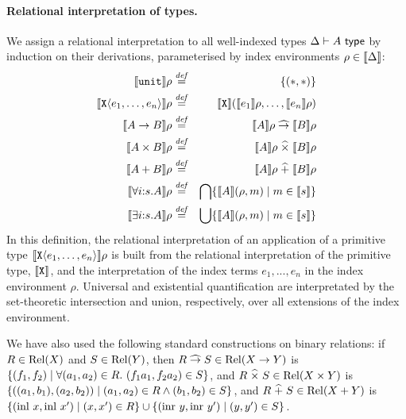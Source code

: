\paragraph{Relational interpretation of types.}
We assign a relational interpretation to all well-indexed types $\Delta
\vdash A \textup{\textsf{ type}}$ by induction on their derivations, parameterised by
index environments 
$\rho \in \llbracket \Delta \rrbracket$:
\begin{eqnarray*}
  \llbracket \texttt{unit} \rrbracket \rho & \stackrel{\mathit{def}}= & \{(*,*)\} \\
  \llbracket \textup{\texttt{X}}\langle e_1,\ldots,e_n \rangle \rrbracket\rho & \stackrel{\mathit{def}}= & 
  \llbracket \textup{\texttt{X}} \rrbracket (\llbracket e_1 \rrbracket\rho, \ldots,
  \llbracket e_n \rrbracket\rho)\\
  \llbracket A \to B \rrbracket \rho & \stackrel{\mathit{def}}= & \llbracket A \rrbracket\rho \mathrel{\widehat\to} \llbracket B \rrbracket \rho \\
  \llbracket A \times B \rrbracket\rho & \stackrel{\mathit{def}}= & \llbracket A \rrbracket \rho \mathrel{\widehat\times} \llbracket B \rrbracket \rho \\
  \llbracket A + B \rrbracket \rho & \stackrel{\mathit{def}}= & \llbracket A \rrbracket \rho \mathrel{\widehat+} \llbracket B \rrbracket \rho \\
  \llbracket \forall i\mathord:s.A \rrbracket \rho & \stackrel{\mathit{def}}= & 
  \bigcap\{ \llbracket A \rrbracket {(\rho,m)} \mathrel| m \in \llbracket s \rrbracket \} \\
  \llbracket \exists i\mathord:s.A \rrbracket \rho & \stackrel{\mathit{def}}= & 
  \bigcup\{ \llbracket A \rrbracket {(\rho,m)} \mathrel| m \in \llbracket s \rrbracket \}
\end{eqnarray*}
In this definition, the relational interpretation of an application of
a primitive type $\llbracket \textup{\texttt{X}}\langle e_1,\ldots,e_n \rangle \rrbracket\rho$ is built from
the relational interpretation of the primitive type,
$\llbracket \textup{\texttt{X}} \rrbracket$, and the interpretation of the index terms
$e_1,...,e_n$ in the index environment $\rho$. Universal and
existential quantification are interpretated by the set-theoretic
intersection and union, respectively, over all extensions of the index
environment.

We have also used the following standard %
constructions on binary relations: if $R \in \mathrm{Rel}(X)$ and $S \in
\mathrm{Rel}(Y)$, then $R \mathrel{\widehat\to} S \in \mathrm{Rel}(X \to Y)$ is %
$\{(f_1,f_2) \mathrel| \forall (a_1,a_2) \in R.\ (f_1a_1,f_2a_2) \in S
\}$, and %
$R \mathrel{\widehat\times} S \in \mathrm{Rel}(X \times Y)$ is %
$\{((a_1,b_1),(a_2,b_2)) \mathrel| (a_1,a_2) \in R \land (b_1,b_2) \in S
\}$, and %
$R \mathrel{\widehat+} S \in \mathrm{Rel}(X + Y)$ is %
$\{ (\mathrm{inl}\ x, \mathrm{inl}\ x') \mathrel| (x,x') \in R \} \cup
\{ (\mathrm{inr}\ y, \mathrm{inr}\ y') \mathrel| (y,y') \in S \}$.


